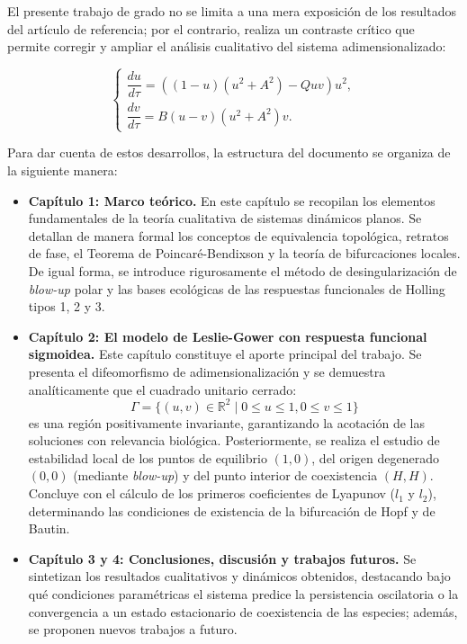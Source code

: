 El presente trabajo de grado no se limita a una mera exposición de los resultados del artículo de referencia; por el contrario, realiza un contraste crítico que permite corregir y ampliar el análisis cualitativo del sistema adimensionalizado:

$$ \begin{cases} 
	\dfrac{du}{d\tau} = \left( (1-u)(u^2 + A^2) - Quv \right) u^2, \\[5pt]
	\dfrac{dv}{d\tau} = B(u-v)(u^2 + A^2)v.
\end{cases} $$

Para dar cuenta de estos desarrollos, la estructura del documento se organiza de la siguiente manera:
	
\begin{itemize}
	\item \textbf{Capítulo 1: Marco teórico.} En este capítulo se recopilan los elementos fundamentales de la teoría cualitativa de sistemas dinámicos planos. Se detallan de manera formal los conceptos de equivalencia topológica, retratos de fase, el Teorema de Poincaré-Bendixson y la teoría de bifurcaciones locales. De igual forma, se introduce rigurosamente el método de desingularización de \textit{blow-up} polar y las bases ecológicas de las respuestas funcionales de Holling tipos 1, 2 y 3.
		
	\item \textbf{Capítulo 2: El modelo de Leslie-Gower con respuesta funcional sigmoidea.} Este capítulo constituye el aporte principal del trabajo. Se presenta el difeomorfismo de adimensionalización y se demuestra analíticamente que el cuadrado unitario cerrado:
	$$ \Gamma = \{ (u,v) \in \mathbb{R}^2 \mid 0 \le u \le 1, 0 \le v \le 1 \} $$
	es una región positivamente invariante, garantizando la acotación de las soluciones con relevancia biológica. Posteriormente, se realiza el estudio de estabilidad local de los puntos de equilibrio $(1,0)$, del origen degenerado $(0,0)$ (mediante \textit{blow-up}) y del punto interior de coexistencia $(H,H)$. Concluye con el cálculo de los primeros coeficientes de Lyapunov ($l_1$ y $l_2$), determinando las condiciones de existencia de la bifurcación de Hopf y de Bautin.
		
	\item \textbf{Capítulo 3 y 4: Conclusiones, discusión y trabajos futuros.} Se sintetizan los resultados cualitativos y dinámicos obtenidos, destacando bajo qué condiciones paramétricas el sistema predice la persistencia oscilatoria o la convergencia a un estado estacionario de coexistencia de las especies; además, se proponen nuevos trabajos a futuro.
\end{itemize}